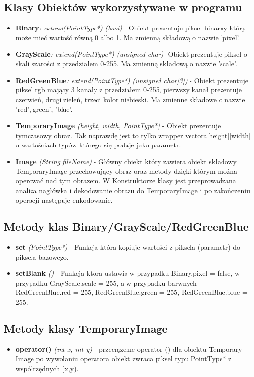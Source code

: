\documentclass{article}
\begin{document}
\subsection{Klasy Obiektów wykorzystywane w programu}
\begin{itemize}
\item {\bfseries Binary}{\itshape : extend(PointType*)} {\itshape (bool)} - Obiekt prezentuje piksel binarny który może mieć wartość równą 0 albo 1. Ma zmienną składową o nazwie 'pixel'.
\item {\bfseries GrayScale}{\itshape : extend(PointType*)} {\itshape (unsigned char)} -Obiekt prezentuje piksel o skali szarości z przedziałem 0-255. Ma zmienną składową o nazwie 'scale'.
\item {\bfseries RedGreenBlue}{\itshape : extend(PointType*)} {\itshape (unsigned char[3])} - Obiekt prezentuje piksel rgb mający 3 kanały z przedziałem 0-255, pierwszy kanał prezentuje czerwień, drugi zieleń, trzeci kolor niebieski. Ma zmienne składowe o nazwie 'red','green', 'blue'.
\item {\bfseries TemporaryImage} {\itshape (height, width, PointType*)} - Obiekt prezentuje tymczasowy obraz. Tak naprawdę jest to tylko wrapper vectora[height][width] o wartościach typów którego się podaje jako parametr.
\item {\bfseries Image} {\itshape (String fileName)} - Główny obiekt który zawiera obiekt składowy TemporaryImage przechowujący obraz oraz metody dzięki którym można operować nad tym obrazem. W Konstruktorze klasy jest przeprowadzana analiza nagłówka i dekodowanie obrazu do TemporaryImage i po zakończeniu operacji następuje enkodowanie.  
\end{itemize}
\subsection{Metody klas Binary/GrayScale/RedGreenBlue}
\begin{itemize}
\item {\bfseries set} {\itshape (PointType*)} - Funkcja która kopiuje wartości z piksela (parametr) do piksela bazowego. 
\item {\bfseries setBlank} {\itshape ()} - Funkcja która ustawia w przypadku Binary.pixel = false, w przypadku GrayScale.scale = 255, a w przypadku barwnych RedGreenBlue.red = 255, RedGreenBlue.green = 255, RedGreenBlue.blue = 255.
\end{itemize}
\subsection{Metody klasy TemporaryImage}
\begin{itemize}
\item {\bfseries operator()} {\itshape (int x, int y)} - przeciążenie operator () dla obiektu Temporary Image po wywołaniu operatora obiekt zwraca piksel typu PointType* z współrzędnych (x,y).
\end{itemize}
\end{document}
